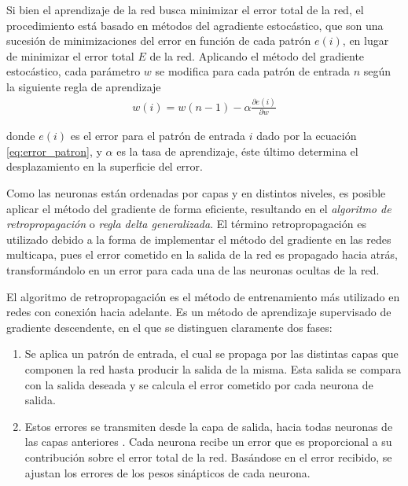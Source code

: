 Si bien el aprendizaje de la red busca minimizar el error total de la red, el procedimiento está basado en métodos del agradiente estocástico, que son una sucesión de minimizaciones del error en función de cada patrón $e(i)$, en lugar de minimizar el error total $E$ de la red. Aplicando el método del gradiente estocástico, cada parámetro $w$ se modifica para cada patrón de entrada $n$ según la siguiente regla de aprendizaje
\begin{eqnarray}
	w(i) = w(n - 1) - \alpha\frac{\partial e(i)}{\partial w}
\end{eqnarray}

donde $e(i)$ es el error para el patrón de entrada $i$ dado por la ecuación \ref{eq:error_patron}, y $\alpha$ es la tasa de aprendizaje, éste último determina el desplazamiento en la superficie del error.

Como las neuronas están ordenadas por capas y en distintos niveles, es posible aplicar el método del gradiente de forma eficiente, resultando en el {\em algoritmo de retropropagación} \cite{Rumelhart1986} o {\em regla delta generalizada}. El término retropropagación es utilizado debido a la forma de implementar el método del gradiente en las redes multicapa, pues el error cometido en la salida de la red es propagado hacia atrás, transformándolo en un error para cada una de las neuronas ocultas de la red.






El algoritmo de retropropagación es el método de entrenamiento más utilizado en redes con conexión hacia adelante. Es un método de aprendizaje supervisado de gradiente descendente, en el que se distinguen claramente dos fases:
\begin{enumerate}
	\item Se aplica un patrón de entrada, el cual se propaga por las distintas capas que componen la red hasta producir la salida de la misma. Esta salida se compara con la salida deseada y se calcula el error cometido por cada neurona de salida.

	\item Estos errores se transmiten desde la capa de salida, hacia todas neuronas de las capas anteriores \cite{Fritsch1996}. Cada neurona recibe un error que es proporcional a su contribución sobre el error total de la red. Basándose en el error recibido, se ajustan los errores de los pesos sinápticos de cada neurona.
\end{enumerate}








